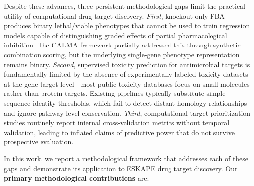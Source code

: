 \documentclass[12pt,a4paper]{article}
\begin{document}
Despite these advances, three persistent methodological gaps limit the practical utility of computational drug target discovery. \textit{First}, knockout-only FBA produces binary lethal/viable phenotypes that cannot be used to train regression models capable of distinguishing graded effects of partial pharmacological inhibition. The CALMA framework partially addressed this through synthetic combination scoring, but the underlying single-gene phenotype representation remains binary. \textit{Second}, supervised toxicity prediction for antimicrobial targets is fundamentally limited by the absence of experimentally labeled toxicity datasets at the gene-target level---most public toxicity databases focus on small molecules rather than protein targets. Existing pipelines typically substitute simple sequence identity thresholds, which fail to detect distant homology relationships and ignore pathway-level conservation. \textit{Third}, computational target prioritization studies routinely report internal cross-validation metrics without temporal validation, leading to inflated claims of predictive power that do not survive prospective evaluation.

In this work, we report a methodological framework that addresses each of these gaps and demonstrate its application to ESKAPE drug target discovery. Our \textbf{primary methodological contributions} are:
\end{document}
